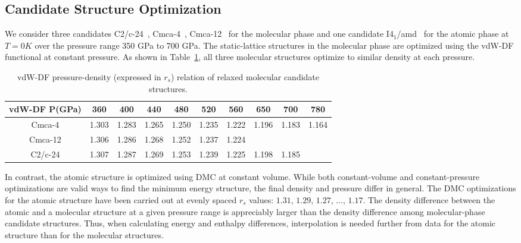 \subsection{Candidate Structure Optimization}
We consider three candidates C2/c-24~\cite{Pickard2007}, Cmca-4~\cite{Johnson2000}, Cmca-12~\cite{Pickard2007} for the molecular phase and one candidate I4$_1$/amd~\cite{McMahon2011} for the atomic phase at $T=0K$ over the pressure range 350 GPa to 700 GPa. The static-lattice structures in the molecular phase are optimized using the vdW-DF functional at constant pressure.
As shown in Table~\ref{tab:hsolid-mol-press-rs}, all three molecular structures optimize to similar density at each pressure.
\begin{table}[h]
	\centering
	\begin{tabular}{cccccccccc}
		\toprule
		vdW-DF P(GPa) & 360 & 400 & 440 & 480 & 520 & 560 & 650 & 700 & 780 \\
		\midrule
		Cmca-4  & 1.303 & 1.283 & 1.265 & 1.250 & 1.235 & 1.222 & 1.196 & 1.183 & 1.164 \\
		Cmca-12 & 1.306 & 1.286 & 1.268 & 1.252 & 1.237 & 1.224 & & & \\
		C2/c-24 & 1.307 & 1.287 & 1.269 & 1.253 & 1.239 & 1.225 & 1.198 & 1.185 & \\
		\bottomrule
	\end{tabular}
	\caption{vdW-DF pressure-density (expressed in $r_s$) relation of relaxed molecular candidate structures.}
	\label{tab:hsolid-mol-press-rs}
\end{table}
In contrast, the atomic structure is optimized using DMC at constant volume.
While both constant-volume and constant-pressure optimizations are valid ways to find the minimum energy structure, the final density and pressure differ in general.
The DMC optimizations for the atomic structure have been carried out at evenly spaced $r_s$ values: $1.31$, $1.29$, $1.27$, $\dots$, $1.17$.
The density difference between the atomic and a molecular structure at a given pressure range is appreciably larger than the density difference among molecular-phase candidate structures.
Thus, when calculating energy and enthalpy differences, interpolation is needed further from data for the atomic structure than for the molecular structures.

